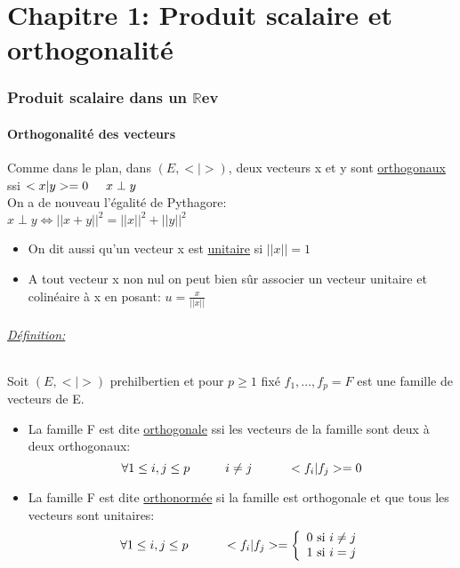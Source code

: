 \documentclass{article}
\author{Frederic Becerril}
\newcommand\tab[1][1cm]{\hspace*{#1}}
\begin{document}
\part*{Chapitre 1: Produit scalaire et orthogonalité}

\section{Produit scalaire dans un $\mathbb{R}$ev}

\subsection{Orthogonalité des vecteurs}

Comme dans le plan, dans $(E, <|>)$, deux vecteurs x et y sont \underline{orthogonaux} ssi $<x|y> = 0 \tab[0.5cm] x \perp y$ \\
On a de nouveau l'égalité de Pythagore: \\
$x \perp y \Leftrightarrow ||x + y||^2 = ||x||^2 + ||y||^2$

\begin{itemize}
    \item On dit aussi qu'un vecteur x est \underline{unitaire} si $||x|| = 1$
    \item A tout vecteur x non nul on peut bien sûr associer un vecteur unitaire et colinéaire à x en posant: $u = \frac{x}{||x||}$
\end{itemize}

\paragraph{\underline{Définition:}}
Soit $(E, <|>)$ prehilbertien et pour $p \geq 1$ fixé ${f_1, \dots, f_p} = F$ est une famille de vecteurs de E.
\begin{itemize}
    \item La famille F est dite \underline{orthogonale} ssi les vecteurs de la famille sont deux à deux orthogonaux:
$$
\forall 1 \leq i, j \leq p \tab i \neq j \tab <f_i | f_j> = 0
$$
    \item La famille F est dite \underline{orthonormée} si la famille est orthogonale et que tous les vecteurs sont unitaires:
$$
\forall 1 \leq i, j \leq p \tab <f_i | f_j> = 
\left\{
    \begin{array}{ll}
        0 \mbox{ si } i \neq j \\
        1 \mbox{ si } i = j \\
    \end{array}
\right.
$$
\end{itemize}
\end{document}

